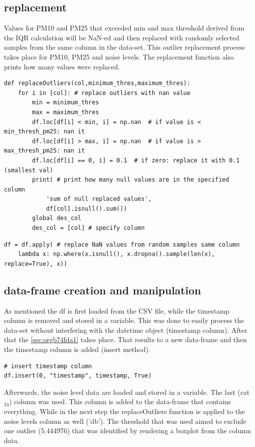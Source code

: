 \documentclass[11pt]{article}
\begin{document}
\subsection{replacement}
\label{sec:org0d6c451}
Values for PM10 and PM25 that exceeded min and max threshold derived from the IQR calculation will be NaN-ed and then replaced with randomly selected samples from the same column in the data-set.  This outlier replacement process takes place for PM10, PM25 and noise levels.  The replacement function also prints how many values were replaced.

\begin{verbatim}
def replaceOutliers(col,minimum_thres,maximum_thres):
    for i in [col]: # replace outliers with nan value
        min = minimum_thres
        max = maximum_thres
        df.loc[df[i] < min, i] = np.nan  # if value is < min_thresh_pm25: nan it
        df.loc[df[i] > max, i] = np.nan  # if value is > max_thresh_pm25: nan it
        df.loc[df[i] == 0, i] = 0.1  # if zero: replace it with 0.1 (smallest val)
        print( # print how many null values are in the specified column
            'sum of null replaced values',
            df[col].isnull().sum())
        global des_col
        des_col = [col] # specify column
\end{verbatim}

\begin{verbatim}
df = df.apply( # replace NaN values from random samples same column
    lambda x: np.where(x.isnull(), x.dropna().sample(len(x), replace=True), x))
\end{verbatim}

\subsection{data-frame creation and manipulation}
\label{sec:org354e853}
As mentioned the df is first loaded from the CSV file, while the timestamp column is removed and stored in a variable.  This was done to easily process the data-set without interfering with the datetime object (timestamp column).  After that the \ref{sec:orgb74fda1} takes place.  That results to a new data-frame and then the timestamp column is added (insert method).
\begin{verbatim}
# insert timestamp column
df.insert(0, "timestamp", timestamp, True)
\end{verbatim}

Afterwards, the noise level data are loaded and stored in a variable.  The last (cat\(_{\text{24}}\)) column was used.  This column is added to the data-frame that contains everything.  While in the next step the replaceOutliers function is applied to the noise levels column as well ('db').  The threshold that was used aimed to exclude one outlier (5.444976) that was identified by rendering a boxplot from the column data.
\end{document}

